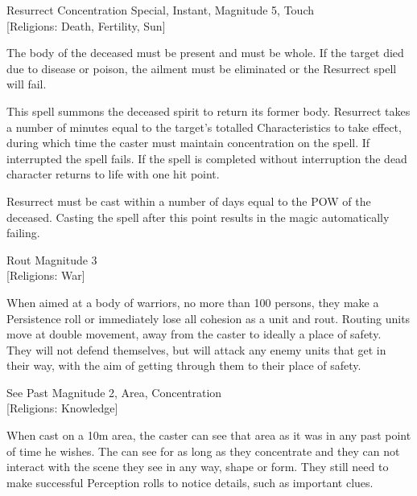 \begin{rpg-spell}
{Resurrect}
{Concentration Special, Instant, Magnitude 5, Touch\\{[Religions: Death, Fertility, Sun]}}

The body of the deceased must be present and must be whole. If the target died due to disease or poison, the ailment must be eliminated or the Resurrect spell will fail. 

This spell summons the deceased spirit to return its former body. Resurrect takes a number of minutes equal to the target’s totalled Characteristics to take effect, during which time the caster must maintain concentration on the spell. If interrupted the spell fails. If the spell is completed without interruption the dead character returns to life with one hit point.

Resurrect must be cast within a number of days equal to the POW of the deceased. Casting the spell after this point results in the magic automatically failing. 
\end{rpg-spell}

\begin{rpg-spell}
{Rout}
{Magnitude 3\\{[Religions: War]}}

When aimed at a body of warriors, no more than 100 persons, they make a Persistence roll or immediately lose all cohesion as a unit and rout. Routing units move at double movement, away from the caster to ideally a place of safety.  They will not defend themselves, but will attack any enemy units that get in their way, with the aim of getting through them to their place of safety.  
\end{rpg-spell}

\begin{rpg-spell}
{See Past}
{Magnitude 2, Area, Concentration\\{[Religions: Knowledge]}}

When cast on a 10m area, the caster can see that area as it was in any past point of time he wishes. The can see for as long as they concentrate and they can not interact with the scene they see in any way, shape or form. They still need to make successful Perception rolls to notice details, such as important clues.
\end{rpg-spell}

